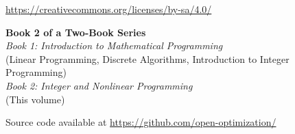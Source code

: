 \bigskip

\doclicenseLongText

\bigskip

\begin{center}
\url{https://creativecommons.org/licenses/by-sa/4.0/}
\end{center}

\vfill

\begin{center}
\textbf{Book 2 of a Two-Book Series}\\[2ex]
\textit{Book 1: Introduction to Mathematical Programming}\\
(Linear Programming, Discrete Algorithms, Introduction to Integer Programming)\\[2ex]
\textit{Book 2: Integer and Nonlinear Programming}\\
(This volume)
\end{center}

\vfill

\begin{center}
{\small Source code available at \url{https://github.com/open-optimization/}}
\end{center}

\vspace{1cm}

\newpage
